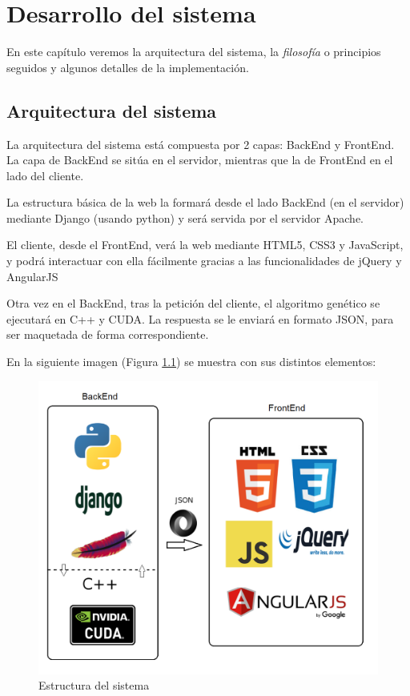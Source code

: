 \chapter{Desarrollo del sistema}

\bigskip
En este capítulo veremos la arquitectura del sistema, la \textit{filosofía} o principios seguidos y algunos detalles de la implementación.


\bigskip
\section{Arquitectura del sistema}
\bigskip

La arquitectura del sistema está compuesta por 2 capas: BackEnd y FrontEnd. La capa de BackEnd se sitúa en el servidor, mientras que la de FrontEnd en el lado del cliente.

\bigskip
La estructura básica de la web la formará desde el lado BackEnd (en el servidor) mediante Django (usando python) y será servida por el servidor Apache. 

El cliente, desde el FrontEnd, verá la web mediante HTML5, CSS3 y JavaScript, y podrá interactuar con ella fácilmente gracias a las funcionalidades de jQuery y AngularJS

Otra vez en el BackEnd, tras la petición del cliente, el algoritmo genético se ejecutará en C++ y CUDA. La respuesta se le enviará en formato JSON, para ser maquetada de forma correspondiente.


\bigskip
En la siguiente imagen (Figura \ref{fig:estructura}) se muestra con sus distintos elementos:

\bigskip
\begin{figure}[h]
	\centering
	\includegraphics[width=1\linewidth]{../images/estructura}
	\caption[Estructura del sistema]{Estructura del sistema}
	\label{fig:estructura}
\end{figure}



